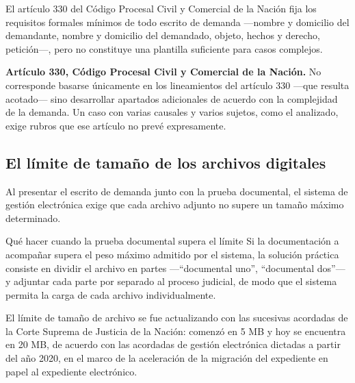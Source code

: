 \documentclass[12pt,oneside]{book}
\begin{document}
El artículo 330 del Código Procesal Civil y Comercial de la Nación fija los requisitos formales mínimos de todo escrito de demanda —nombre y domicilio del demandante, nombre y domicilio del demandado, objeto, hechos y derecho, petición—, pero no constituye una plantilla suficiente para casos complejos.

\begin{important}
\textbf{Artículo 330, Código Procesal Civil y Comercial de la Nación.} No corresponde basarse únicamente en los lineamientos del artículo 330 —que resulta acotado— sino desarrollar apartados adicionales de acuerdo con la complejidad de la demanda. Un caso con varias causales y varios sujetos, como el analizado, exige rubros que ese artículo no prevé expresamente.
\end{important}

\subsection{El límite de tamaño de los archivos digitales}

Al presentar el escrito de demanda junto con la prueba documental, el sistema de gestión electrónica exige que cada archivo adjunto no supere un tamaño máximo determinado.

\begin{example}{Qué hacer cuando la prueba documental supera el límite}
Si la documentación a acompañar supera el peso máximo admitido por el sistema, la solución práctica consiste en dividir el archivo en partes —``documental uno'', ``documental dos''— y adjuntar cada parte por separado al proceso judicial, de modo que el sistema permita la carga de cada archivo individualmente.
\end{example}

\begin{note}
El límite de tamaño de archivo se fue actualizando con las sucesivas acordadas de la Corte Suprema de Justicia de la Nación: comenzó en 5 MB y hoy se encuentra en 20 MB, de acuerdo con las acordadas de gestión electrónica dictadas a partir del año 2020, en el marco de la aceleración de la migración del expediente en papel al expediente electrónico.
\end{note}
\end{document}
